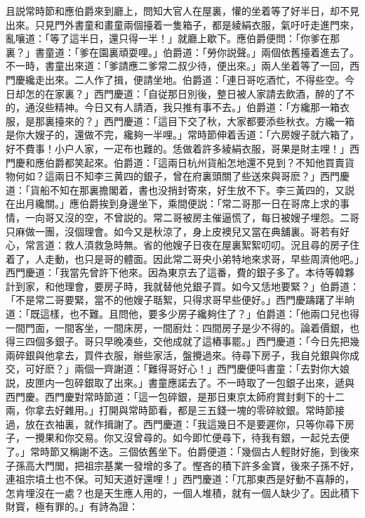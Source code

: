 且説常時節和應伯爵來到廳上，問知大官人在屋裏，懽的坐着等了好半日，却不見出來。只見門外書童和畫童兩個擡着一隻箱子，都是綾絹衣服，氣吁吁走進門來，亂嚷道：「等了這半日，還只得一半！」就廳上歇下。應伯爵便問：「你爹在那裏？」書童道：「爹在園裏頑耍哩。」伯爵道：「勞你説聲。」兩個依舊擡着進去了。不一時，書童出來道：「爹請應二爹常二叔少待，便出來。」兩人坐着等了一回，西門慶纔走出來。二人作了揖，便請坐地。伯爵道：「連日哥吃酒忙，不得些空。今日却怎的在家裏？」西門慶道：「自従那日別後，整日被人家請去飲酒，醉的了不的，通沒些精神。今日又有人請酒，我只推有事不去。」伯爵道：「方纔那一箱衣服，是那裏擡來的？」西門慶道：「這目下交了秋，大家都要添些秋衣。方纔一箱是你大嫂子的，還做不完，纔夠一半哩。」常時節伸着舌道：「六房嫂子就六箱了，好不費事！小户人家，一疋布也難的。恁做着許多綾絹衣服，哥果是財主哩！」西門慶和應伯爵都笑起來。伯爵道：「這兩日杭州貨船怎地還不見到？不知他買賣貨物何如？這兩日不知李三黄四的銀子，曾在府裏頭關了些送來與哥麽？」西門慶道：「貨船不知在那裏擔閣着，書也没捎封寄來，好生放不下。李三黃四的，又説在出月纔關。」應伯爵挨到身邊坐下，乘間便説：「常二哥那一日在哥席上求的事情，一向哥又沒的空，不曾説的。常二哥被房主催逼慌了，每日被嫂子埋怨。二哥只麻做一團，沒個理會。如今又是秋涼了，身上皮襖兒又當在典舖裏。哥若有好心，常言道：救人湏救急時無。省的他嫂子日夜在屋裏絮絮叨叨。況且尋的房子住着了，人走動，也只是哥的體面。因此常二哥央小弟特地來求哥，早些周濟他吧。」西門慶道：「我當先曾許下他來。因為東京去了這番，費的銀子多了。本待等韓夥計到家，和他理會，要房子時，我就替他兑銀子買。如今又恁地要緊？」伯爵道：「不是常二哥要緊，當不的他嫂子聒絮，只得求哥早些便好。」西門慶躊躇了半晌道：「既這樣，也不難。且問他，要多少房子纔夠住了？」伯爵道：「他兩口兒也得一間門面，一間客坐，一間床房，一間廚灶：四間房子是少不得的。論着價銀，也得三四個多銀子。哥只早晚凑些，交他成就了這樁事罷。」西門慶道：「今日先把幾兩碎銀與他拿去，買件衣服，辦些家活，盤攪過來。待尋下房子，我自兑銀與你成交，可好麽？」兩個一齊謝道：「難得哥好心！」西門慶便呌書童：「去對你大娘説，皮匣内一包碎銀取了出來。」書童應諾去了。不一時取了一包銀子出來，遞與西門慶。西門慶對常時節道：「這一包碎銀，是那日東京太師府賞封剩下的十二兩，你拿去好雜用。」打開與常時節看，都是三五錢一塊的零碎紋銀。常時節接過，放在衣袖裏，就作揖謝了。西門慶道：「我這幾日不是要遲你，只等你尋下房子，一攪果和你交易。你又沒曾尋的。如今即忙便尋下，待我有銀，一起兑去便了。」常時節又稱謝不迭。三個依舊坐下。伯爵便道：「幾個古人輕財好施，到後來子孫高大門閭，把祖宗基業一發增的多了。慳吝的積下許多金寶，後來子孫不好，連祖宗墳土也不保。可知天道好還哩！」西門慶道：「兀那東西是好動不喜靜的，怎肯埋沒在一處？也是天生應人用的，一個人堆積，就有一個人缺少了。因此積下財寳，極有罪的。」有詩為證：

